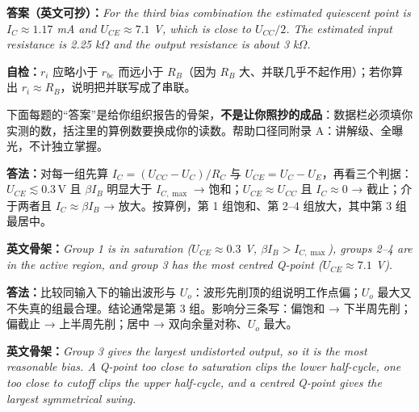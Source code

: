 \documentclass[11pt]{ctexart}
\let\orighdr\hdr
\renewcommand{\hdr}[2]{\needspace{12\baselineskip}\orighdr{#1}{#2}}
\let\origsubhdr\subhdr
\renewcommand{\subhdr}[1]{\needspace{3\baselineskip}\origsubhdr{#1}}
\begin{document}
\textbf{答案（英文可抄）：}\textit{For the third bias combination the estimated quiescent point is $I_C\approx1.17$ mA and $U_{CE}\approx7.1$ V, which is close to $U_{CC}/2$. The estimated input resistance is 2.25 k$\Omega$ and the output resistance is about 3 k$\Omega$.}

\textbf{自检：}$r_i$ 应略小于 $r_{be}$ 而远小于 $R_B$（因为 $R_B$ 大、并联几乎不起作用）；若你算出 $r_i\approx R_B$，说明把并联写成了串联。

\newpage
{}\label{app:B}

\noindent 下面每题的“答案”是给你组织报告的骨架，\textbf{不是让你照抄的成品}：数据栏必须填你实测的数，括注里的算例数要换成你的读数。帮助口径同附录 A：讲解级、全曝光，不计独立掌握。



\textbf{答法：}对每一组先算 $I_C=(U_{CC}-U_C)/R_C$ 与 $U_{CE}=U_C-U_E$，再看三个判据：$U_{CE}\lesssim0.3\,\mathrm{V}$ 且 $\beta I_B$ 明显大于 $I_{C,\max}$ → 饱和；$U_{CE}\approx U_{CC}$ 且 $I_C\approx0$ → 截止；介于两者且 $I_C\approx\beta I_B$ → 放大。按算例，第 1 组饱和、第 2--4 组放大，其中第 3 组最居中。

\textbf{英文骨架：}\textit{Group 1 is in saturation ($U_{CE}\approx0.3$ V, $\beta I_B>I_{C,\max}$), groups 2--4 are in the active region, and group 3 has the most centred Q-point ($U_{CE}\approx7.1$ V).}



\textbf{答法：}比较同输入下的输出波形与 $U_o$：波形先削顶的组说明工作点偏；$U_o$ 最大又不失真的组最合理。结论通常是第 3 组。影响分三条写：偏饱和 → 下半周先削；偏截止 → 上半周先削；居中 → 双向余量对称、$U_o$ 最大。

\textbf{英文骨架：}\textit{Group 3 gives the largest undistorted output, so it is the most reasonable bias. A Q-point too close to saturation clips the lower half-cycle, one too close to cutoff clips the upper half-cycle, and a centred Q-point gives the largest symmetrical swing.}
\end{document}
